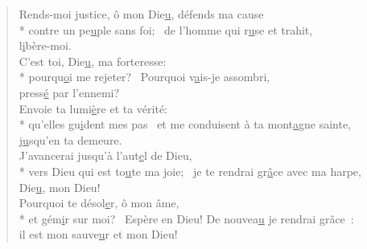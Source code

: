 \begin{verse}
Rends-moi justice, ô mon Die\underline{u}, défends ma cause \\*
contre un pe\underline{u}ple sans foi;~\psalmstar
de l’homme qui r\underline{u}se et trahit, \\
l\underline{i}bère-moi. \\

C’est toi, Die\underline{u}, ma forteresse: \\*
pourqu\underline{o}i me rejeter?~\psalmstar
Pourquoi v\underline{a}is-je assombri, \\
press\underline{é} par l’ennemi? \\

Envoie ta lumi\underline{è}re et ta vérité: \\*
qu’elles gu\underline{i}dent mes pas~\psalmstar
et me conduisent à ta mont\underline{a}gne sainte, \\
j\underline{u}squ’en ta demeure. \\

J’avancerai jusqu’à l’aut\underline{e}l de Dieu, \\*
vers Dieu qui est to\underline{u}te ma joie;~\psalmstar
je te rendrai gr\underline{â}ce avec ma harpe, \\
Die\underline{u}, mon Dieu! \\

Pourquoi te désol\underline{e}r, ô mon âme, \\*
et gém\underline{i}r sur moi?~\psalmstar
Espère en Dieu! De nouvea\underline{u} je rendrai grâce : \\
il est mon sauve\underline{u}r et mon Dieu! \\
\end{verse}

